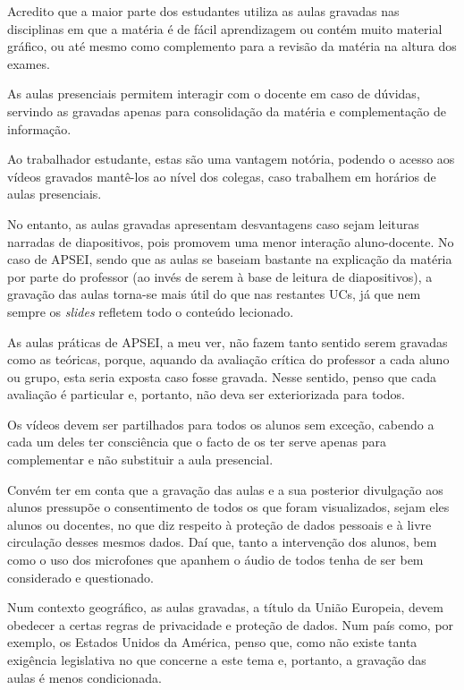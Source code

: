 \documentclass[portuguese, 11pt, a4paper, titlepage, oneside]{article}
\begin{document}
Acredito que a maior parte dos estudantes utiliza as aulas gravadas nas disciplinas em que a matéria é de fácil aprendizagem ou contém muito material gráfico, ou até mesmo como complemento para a revisão da matéria na altura dos exames.

As aulas presenciais permitem interagir com o docente em caso de dúvidas, servindo as gravadas apenas para consolidação da matéria e complementação de informação.

Ao trabalhador estudante, estas são uma vantagem notória, podendo o acesso aos vídeos gravados mantê-los ao nível dos colegas, caso trabalhem em horários de aulas presenciais.

No entanto, as aulas gravadas apresentam desvantagens caso sejam leituras narradas de diapositivos, pois promovem uma menor interação aluno-docente. No caso de APSEI, sendo que as aulas se baseiam bastante na explicação da matéria por parte do professor (ao invés de serem à base de leitura de diapositivos), a gravação das aulas torna-se mais útil do que nas restantes UCs, já que nem sempre os \textit{slides} refletem todo o conteúdo lecionado.

As aulas práticas de APSEI, a meu ver, não fazem tanto sentido serem gravadas como as teóricas, porque, aquando da avaliação crítica do professor a cada aluno ou grupo, esta seria exposta caso fosse gravada. Nesse sentido, penso que cada avaliação é particular e, portanto, não deva ser exteriorizada para todos.

Os vídeos devem ser partilhados para todos os alunos sem exceção, cabendo a cada um deles ter consciência que o facto de os ter serve apenas para complementar e não substituir a aula presencial.

Convém ter em conta que a gravação das aulas e a sua posterior divulgação aos alunos pressupõe o consentimento de todos os que foram visualizados, sejam eles alunos ou docentes, no que diz respeito à proteção de dados pessoais e à livre circulação desses mesmos dados. Daí que, tanto a intervenção dos alunos, bem como o uso dos microfones que apanhem o áudio de todos tenha de ser bem considerado e questionado.

Num contexto geográfico, as aulas gravadas, a título da União Europeia, devem obedecer a certas regras de privacidade e proteção de dados. Num país como, por exemplo, os Estados Unidos da América, penso que, como não existe tanta exigência legislativa no que concerne a este tema e, portanto, a gravação das aulas é menos condicionada.
\end{document}
